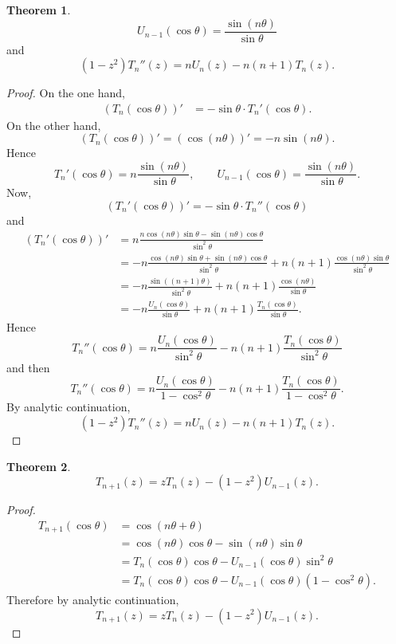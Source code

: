 \documentclass{article}
\theoremstyle{definition}
\newtheorem{theorem}{Theorem}
\theoremstyle{definition}
\begin{document}
\begin{theorem}
\[
U_{n-1}(\cos \theta) = \frac{\sin(n\theta)}{\sin \theta}
\]
and
\[
(1-z^2)T_n''(z) = n U_n(z) - n(n+1) T_n(z).
\]
\label{D2T}
\end{theorem}
\begin{proof}
On the one hand,
\begin{align*}
(T_n(\cos \theta))'&=-\sin\theta \cdot T_n'(\cos \theta).
\end{align*}
On the other hand,
\[
(T_n(\cos \theta))'
=(\cos (n\theta))'
=-n\sin(n\theta).
\]
Hence
\[
T_n'(\cos \theta) = n \frac{\sin (n\theta)}{\sin \theta},
\qquad U_{n-1}(\cos \theta) = \frac{\sin(n\theta)}{\sin \theta}.
\]
Now,
\[
(T_n'(\cos \theta))' =
-\sin \theta\cdot T_n''(\cos \theta)
\]
and
\begin{align*}
(T_n'(\cos \theta))' &= n \frac{n\cos(n\theta)\sin\theta - \sin(n\theta)\cos \theta}{\sin^2 \theta}\\
&=-n\frac{\cos(n\theta)\sin \theta+\sin(n\theta)\cos \theta}{\sin^2\theta}
+n(n+1) \frac{\cos(n\theta)\sin\theta}{\sin^2\theta}\\
&=-n\frac{\sin((n+1)\theta)}{\sin^2\theta}+n(n+1) \frac{\cos(n\theta)}{\sin\theta}\\
&=-n \frac{U_n(\cos \theta)}{\sin \theta} + n(n+1) \frac{T_n(\cos \theta)}{\sin \theta}.
\end{align*}
Hence
\[
T_n''(\cos \theta) = n \frac{U_n(\cos \theta)}{\sin^2 \theta} - n(n+1) \frac{T_n(\cos \theta)}{\sin^2 \theta}
\]
and then
\[
T_n''(\cos \theta) 
=n \frac{U_n(\cos \theta)}{1-\cos^2\theta} - n(n+1) \frac{T_n(\cos \theta)}{1-\cos^2\theta}.
\]
By analytic continuation,
\[
(1-z^2)T_n''(z) = n U_n(z) - n(n+1) T_n(z).
\]
\end{proof}

\begin{theorem}
\[
T_{n+1}(z) = z T_n(z) - (1-z^2)U_{n-1}(z).
\]
\label{Tnformula}
\end{theorem}
\begin{proof}
\begin{align*}
T_{n+1}(\cos \theta)&=\cos(n\theta+\theta)\\
&=\cos(n\theta)\cos\theta - \sin(n\theta)\sin\theta\\
&=T_n(\cos \theta) \cos \theta - U_{n-1}(\cos \theta)\sin^2\theta\\
&=T_n(\cos \theta) \cos \theta - U_{n-1}(\cos \theta)(1-\cos^2\theta).
\end{align*}
Therefore by analytic continuation,
\[
T_{n+1}(z) = z T_n(z) - (1-z^2)U_{n-1}(z).
\]
\end{proof}
\end{document}
